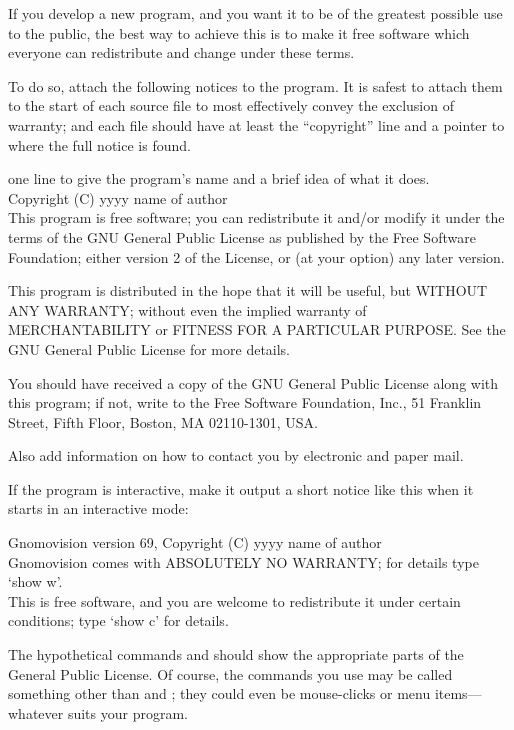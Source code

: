 \begin{lrbox}{\gpl}
\begin{minipage}{3\textwidth}
If you develop a new program, and you want it to be of the greatest
possible use to the public, the best way to achieve this is to make it
free software which everyone can redistribute and change under these
terms.

To do so, attach the following notices to the program.  It is safest to
attach them to the start of each source file to most effectively convey
the exclusion of warranty; and each file should have at least the
``copyright'' line and a pointer to where the full notice is found.

\beginnarrower
  one line to give the program's name and a brief idea of what it does. \\
  Copyright (C) yyyy  name of author \\

  This program is free software; you can redistribute it and/or modify
  it under the terms of the GNU General Public License as published by
  the Free Software Foundation; either version 2 of the License, or
  (at your option) any later version.

  This program is distributed in the hope that it will be useful,
  but WITHOUT ANY WARRANTY; without even the implied warranty of
  MERCHANTABILITY or FITNESS FOR A PARTICULAR PURPOSE.  See the
  GNU General Public License for more details.

  You should have received a copy of the GNU General Public License
  along with this program; if not, write to the Free Software
  Foundation, Inc., 51 Franklin Street, Fifth Floor, Boston, MA  02110-1301, USA.
\endnarrower

Also add information on how to contact you by electronic and paper mail.

If the program is interactive, make it output a short notice like this
when it starts in an interactive mode:

\beginnarrower
  Gnomovision version 69, Copyright (C) yyyy  name of author \\
  Gnomovision comes with ABSOLUTELY NO WARRANTY; for details type `show w'. \\
  This is free software, and you are welcome to redistribute it
  under certain conditions; type `show c' for details.
\endnarrower


The hypothetical commands  and  should show the appropriate parts of the General Public License.  Of
course, the commands you use may be called something other than
 and ; they could even be
mouse-clicks or menu items---whatever suits your program.


\end{minipage}
\end{lrbox}
